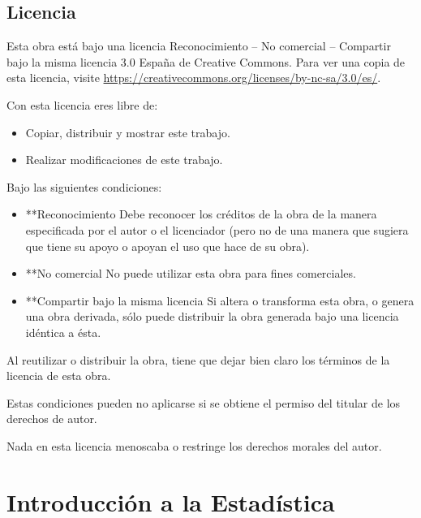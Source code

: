 \documentclass[
  spanish,
  a4paper,
]{scrreport}
\providecommand{\tightlist}{%
  \setlength{\itemsep}{0pt}\setlength{\parskip}{0pt}}
\theoremstyle{plain}
\theoremstyle{definition}
\theoremstyle{definition}
\theoremstyle{remark}
\begin{document}
\section*{Licencia}\label{licencia}


Esta obra está bajo una licencia Reconocimiento -- No comercial --
Compartir bajo la misma licencia 3.0 España de Creative Commons. Para
ver una copia de esta licencia, visite
\url{https://creativecommons.org/licenses/by-nc-sa/3.0/es/}.

Con esta licencia eres libre de:

\begin{itemize}
\tightlist
\item
  Copiar, distribuir y mostrar este trabajo.
\item
  Realizar modificaciones de este trabajo.
\end{itemize}

Bajo las siguientes condiciones:

\begin{itemize}
\item
  **Reconocimiento Debe reconocer los créditos de la obra de la manera
  especificada por el autor o el licenciador (pero no de una manera que
  sugiera que tiene su apoyo o apoyan el uso que hace de su obra).
\item
  **No comercial No puede utilizar esta obra para fines comerciales.
\item
  **Compartir bajo la misma licencia Si altera o transforma esta obra, o
  genera una obra derivada, sólo puede distribuir la obra generada bajo
  una licencia idéntica a ésta.
\end{itemize}

Al reutilizar o distribuir la obra, tiene que dejar bien claro los
términos de la licencia de esta obra.

Estas condiciones pueden no aplicarse si se obtiene el permiso del
titular de los derechos de autor.

Nada en esta licencia menoscaba o restringe los derechos morales del
autor.


\chapter{Introducción a la
Estadística}\label{introducciuxf3n-a-la-estaduxedstica}
\end{document}
